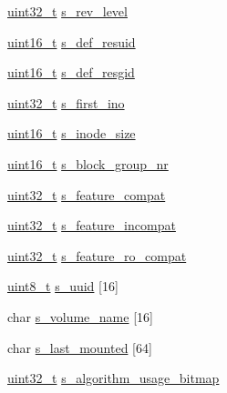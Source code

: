 \begin{DoxyCompactItemize}
\item 
\hyperlink{types_8h_a33594304e786b158f3fb30289278f5af}{uint32\-\_\-t} \hyperlink{structext2__super__block_a70b07eaf44b6a5e777b8072ee4b593b4}{s\-\_\-rev\-\_\-level}
\item 
\hyperlink{types_8h_adf4d876453337156dde61095e1f20223}{uint16\-\_\-t} \hyperlink{structext2__super__block_a83da108c4a1f27a275f54970fb8edf07}{s\-\_\-def\-\_\-resuid}
\item 
\hyperlink{types_8h_adf4d876453337156dde61095e1f20223}{uint16\-\_\-t} \hyperlink{structext2__super__block_a2973f6cda59f008e1f649c6d68ddafd6}{s\-\_\-def\-\_\-resgid}
\item 
\hyperlink{types_8h_a33594304e786b158f3fb30289278f5af}{uint32\-\_\-t} \hyperlink{structext2__super__block_a0d3a8f3c14e0a971750cfdfbc2cf6070}{s\-\_\-first\-\_\-ino}
\item 
\hyperlink{types_8h_adf4d876453337156dde61095e1f20223}{uint16\-\_\-t} \hyperlink{structext2__super__block_a9a1ee9cd5f706fa2e753a4c781ebae73}{s\-\_\-inode\-\_\-size}
\item 
\hyperlink{types_8h_adf4d876453337156dde61095e1f20223}{uint16\-\_\-t} \hyperlink{structext2__super__block_aa69ff4c80207a79de2464e3065df607c}{s\-\_\-block\-\_\-group\-\_\-nr}
\item 
\hyperlink{types_8h_a33594304e786b158f3fb30289278f5af}{uint32\-\_\-t} \hyperlink{structext2__super__block_a1cf404a1bcfb748e924c62032cd723a5}{s\-\_\-feature\-\_\-compat}
\item 
\hyperlink{types_8h_a33594304e786b158f3fb30289278f5af}{uint32\-\_\-t} \hyperlink{structext2__super__block_a56005d1ae97dc32f86567d018c753440}{s\-\_\-feature\-\_\-incompat}
\item 
\hyperlink{types_8h_a33594304e786b158f3fb30289278f5af}{uint32\-\_\-t} \hyperlink{structext2__super__block_a9c63e7954f0344d3de19aad4099d84c7}{s\-\_\-feature\-\_\-ro\-\_\-compat}
\item 
\hyperlink{types_8h_aba7bc1797add20fe3efdf37ced1182c5}{uint8\-\_\-t} \hyperlink{structext2__super__block_a1a546d295c2dc760ece8bf44c7623eb3}{s\-\_\-uuid} \mbox{[}16\mbox{]}
\item 
char \hyperlink{structext2__super__block_aafa5ddd1cf9fbf19aa2b80e83bff5a43}{s\-\_\-volume\-\_\-name} \mbox{[}16\mbox{]}
\item 
char \hyperlink{structext2__super__block_ad2849dfeab713d00ddd93c97eaf80cea}{s\-\_\-last\-\_\-mounted} \mbox{[}64\mbox{]}
\item 
\hyperlink{types_8h_a33594304e786b158f3fb30289278f5af}{uint32\-\_\-t} \hyperlink{structext2__super__block_ab3772dfdb48734922447cc462e5495ed}{s\-\_\-algorithm\-\_\-usage\-\_\-bitmap}

\end{DoxyCompactItemize}
